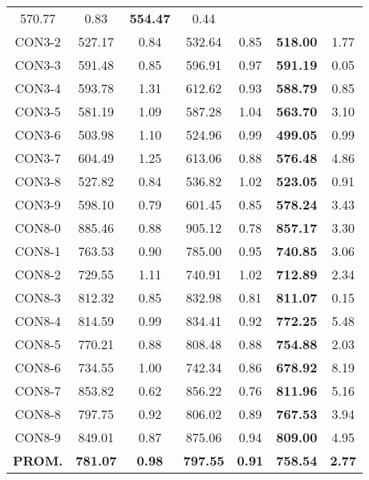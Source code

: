 \begin{table}[ht]
\begin{tabular}{c c c c c c c}
570.77 & 0.83 & \bf{554.47} & 
0.44\\CON3-2 & 527.17 & 0.84 & 
532.64 & 0.85 & \bf{518.00} & 
1.77\\CON3-3 & 591.48 & 0.85 & 
596.91 & 0.97 & \bf{591.19} & 
0.05\\CON3-4 & 593.78 & 1.31 & 
612.62 & 0.93 & \bf{588.79} & 
0.85\\CON3-5 & 581.19 & 1.09 & 
587.28 & 1.04 & \bf{563.70} & 
3.10\\CON3-6 & 503.98 & 1.10 & 
524.96 & 0.99 & \bf{499.05} & 
0.99\\CON3-7 & 604.49 & 1.25 & 
613.06 & 0.88 & \bf{576.48} & 
4.86\\CON3-8 & 527.82 & 0.84 & 
536.82 & 1.02 & \bf{523.05} & 
0.91\\CON3-9 & 598.10 & 0.79 & 
601.45 & 0.85 & \bf{578.24} & 
3.43\\CON8-0 & 885.46 & 0.88 & 
905.12 & 0.78 & \bf{857.17} & 
3.30\\CON8-1 & 763.53 & 0.90 & 
785.00 & 0.95 & \bf{740.85} & 
3.06\\CON8-2 & 729.55 & 1.11 & 
740.91 & 1.02 & \bf{712.89} & 
2.34\\CON8-3 & 812.32 & 0.85 & 
832.98 & 0.81 & \bf{811.07} & 
0.15\\CON8-4 & 814.59 & 0.99 & 
834.41 & 0.92 & \bf{772.25} & 
5.48\\CON8-5 & 770.21 & 0.88 & 
808.48 & 0.88 & \bf{754.88} & 
2.03\\CON8-6 & 734.55 & 1.00 & 
742.34 & 0.86 & \bf{678.92} & 
8.19\\CON8-7 & 853.82 & 0.62 & 
856.22 & 0.76 & \bf{811.96} & 
5.16\\CON8-8 & 797.75 & 0.92 & 
806.02 & 0.89 & \bf{767.53} & 
3.94\\CON8-9 & 849.01 & 0.87 & 
875.06 & 0.94 & \bf{809.00} & 
4.95\\\bf{PROM.} & 
\bf{781.07} & \bf{0.98} & \bf{797.55} & \bf{0.91} & \bf{758.54} & \bf{2.77}\\[1ex]\hline
\end{tabular}
\label{table:nonlin}
\end{table} \clearpage

